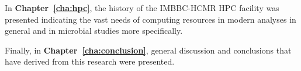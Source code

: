    In \textbf{Chapter~\ref{cha:hpc}}, the history of the IMBBC-HCMR HPC facility was presented indicating the vast needs of computing resources in modern analyses in general and in microbial studies more specifically. 

   Finally, in \textbf{Chapter~\ref{cha:conclusion}}, general discussion and conclusions that have derived from this research were presented. 





% 
